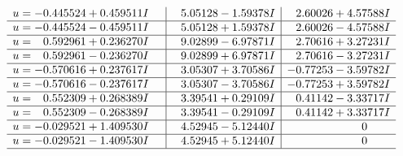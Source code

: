 \documentclass[1p]{elsarticle_modified}
\theoremstyle{definition}
\begin{document}
$$\begin{array}{c|c|c}
\begin{aligned}
u &= -0.445524 + 0.459511 I\end{aligned}
 & \phantom{-}5.05128 - 1.59378 I & \phantom{-}2.60026 + 4.57588 I \\ \hline\begin{aligned}
u &= -0.445524 - 0.459511 I\end{aligned}
 & \phantom{-}5.05128 + 1.59378 I & \phantom{-}2.60026 - 4.57588 I \\ \hline\begin{aligned}
u &= \phantom{-}0.592961 + 0.236270 I\end{aligned}
 & \phantom{-}9.02899 - 6.97871 I & \phantom{-}2.70616 + 3.27231 I \\ \hline\begin{aligned}
u &= \phantom{-}0.592961 - 0.236270 I\end{aligned}
 & \phantom{-}9.02899 + 6.97871 I & \phantom{-}2.70616 - 3.27231 I \\ \hline\begin{aligned}
u &= -0.570616 + 0.237617 I\end{aligned}
 & \phantom{-}3.05307 + 3.70586 I & -0.77253 - 3.59782 I \\ \hline\begin{aligned}
u &= -0.570616 - 0.237617 I\end{aligned}
 & \phantom{-}3.05307 - 3.70586 I & -0.77253 + 3.59782 I \\ \hline\begin{aligned}
u &= \phantom{-}0.552309 + 0.268389 I\end{aligned}
 & \phantom{-}3.39541 + 0.29109 I & \phantom{-}0.41142 - 3.33717 I \\ \hline\begin{aligned}
u &= \phantom{-}0.552309 - 0.268389 I\end{aligned}
 & \phantom{-}3.39541 - 0.29109 I & \phantom{-}0.41142 + 3.33717 I \\ \hline\begin{aligned}
u &= -0.029521 + 1.409530 I\end{aligned}
 & \phantom{-}4.52945 - 5.12440 I & \phantom{-0.000000 } 0 \\ \hline\begin{aligned}
u &= -0.029521 - 1.409530 I\end{aligned}
 & \phantom{-}4.52945 + 5.12440 I & \phantom{-0.000000 } 0\\
 \hline 
 \end{array}$$\newpage$$\begin{array}{c|c|c}  

\end{array}$$
\end{document}
